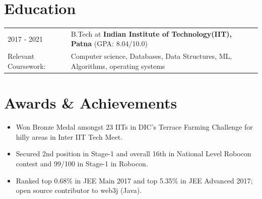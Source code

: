 \documentclass[a4paper,10pt]{article}
\newcommand{\customHeading}[1]{
    \section{\texorpdfstring{#1 \hrulefill}{}}
}
\begin{document}
\customHeading{Education}
\begin{tabularx}{\linewidth}{@{}l X@{}}	
2017 - 2021 & B.Tech at \textbf{Indian Institute of Technology(IIT), Patna} \hfill \normalsize (GPA: 8.04/10.0) \\

Relevant Coursework: & Computer science, Databases, Data Structures, ML, Algorithms, operating systems
\end{tabularx}

\customHeading{Awards \& Achievements}
\begin{itemize}[nosep,after=\strut, leftmargin=1em, itemsep=3pt]
    \item Won Bronze Medal amongst 23 IITs in DIC’s Terrace Farming Challenge for hilly areas in Inter IIT Tech Meet.
    \item Secured 2nd position in Stage-1 and overall 16th in National Level Robocon contest and 99/100 in Stage-1 in Robocon.
    \item  Ranked top 0.68\% in JEE Main 2017 and top 5.35\% in JEE Advanced 2017; open source contributor to web3j (Java).
\end{itemize}





\vfill
\end{document}
